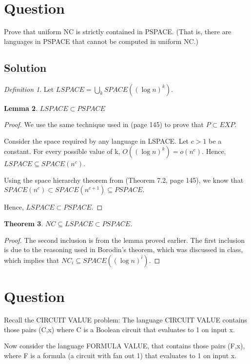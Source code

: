 \documentclass[10pt]{amsart}
\newtheorem{thm}{Theorem}[subsection]
\newtheorem{lem}[thm]{Lemma}
\theoremstyle{remark}
\newtheorem{defn}[thm]{Definition}
\begin{document}
\section{Question}
Prove that uniform NC is strictly contained in PSPACE. (That is, there are languages in PSPACE that cannot be computed in uniform NC.)

\subsection{Solution}
\begin{defn}
Let $LSPACE = \bigcup_{k} SPACE((\log n)^{k})$.
\end{defn}

\begin{lem}
$LSPACE \subset PSPACE$
\end{lem}
\begin{proof}
We use the same technique used in \cite{papadimitriouCC} (page 145) to prove that $P \subset EXP$.

Consider the space required by any language in LSPACE. Let $c>1$ be a constant. For every possible value of k, $O((\log n)^{k}) = o(n^{c})$. Hence, $LSPACE \subseteq SPACE(n^{c})$.

Using the space hierarchy theorem from \cite{papadimitriouCC} (Theorem 7.2, page 145), we know that $SPACE(n^{c}) \subset SPACE(n^{c+1}) \subseteq PSPACE$.

Hence, $LSPACE \subset PSPACE$.
\end{proof}

\begin{thm}
$NC \subseteq LSPACE \subset PSPACE$.
\end{thm}
\begin{proof}
The second inclusion is from the lemma proved earlier. The first inclusion is due to the reasoning used in Borodin's theorem, which was discussed in class, which implies that $NC_{i} \subseteq SPACE((\log n)^{i})$.
\end{proof}

\section{Question}
Recall the CIRCUIT VALUE problem: The language CIRCUIT VALUE contains those pairs (C,x) where C is a Boolean circuit that evaluates to 1 on input x.

Now consider the language FORMULA VALUE, that contains those pairs (F,x), where F is a formula (a circuit with fan out 1) that evaluates to 1 on input x.
\end{document}
